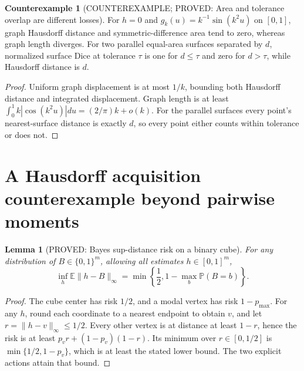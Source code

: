 \documentclass[11pt]{article}
\newcommand{\E}{\mathbb E}
\newtheorem{lemma}[theorem]{Lemma}
\theoremstyle{definition}
\newtheorem{counterexample}[theorem]{Counterexample}
\theoremstyle{remark}
\begin{document}
\begin{counterexample}[COUNTEREXAMPLE; PROVED: Area and tolerance overlap are different losses]
\label{rthreegeo:areansd}
For $h=0$ and $g_k(u)=k^{-1}\sin(k^2u)$ on $[0,1]$, graph Hausdorff
distance and symmetric-difference area tend to zero, whereas graph
length diverges. For two parallel equal-area surfaces separated by $d$,
normalized surface Dice at tolerance $\tau$ is one for $d\le\tau$ and
zero for $d>\tau$, while Hausdorff distance is $d$.
\end{counterexample}
\begin{proof}
Uniform graph displacement is at most $1/k$, bounding both Hausdorff
distance and integrated displacement. Graph length is at least
$\int_0^1 k|\cos(k^2u)|du=(2/\pi)k+o(k)$.
For the parallel surfaces every point's nearest-surface distance is
exactly $d$, so every point either counts within tolerance or does not.
\end{proof}

\section{A Hausdorff acquisition counterexample beyond pairwise moments}

\begin{lemma}[PROVED: Bayes sup-distance risk on a binary cube]
\label{rthreegeo:cuberisk}
For any distribution of $B\in\{0,1\}^m$, allowing all estimates
$h\in[0,1]^m$,
\[
 \inf_h\E\|h-B\|_\infty
 =\min\left\{\frac12,1-\max_b\mathbb P(B=b)\right\}.
\]
\end{lemma}
\begin{proof}
The cube center has risk $1/2$, and a modal vertex has risk $1-p_{\max}$.
For any $h$, round each coordinate to a nearest endpoint to obtain $v$,
and let $r=\|h-v\|_\infty\le1/2$.
Every other vertex is at distance at least $1-r$, hence the risk is at
least $p_vr+(1-p_v)(1-r)$. Its minimum over $r\in[0,1/2]$ is
$\min\{1/2,1-p_v\}$, which is at least the stated lower bound.
The two explicit actions attain that bound.
\end{proof}
\end{document}
